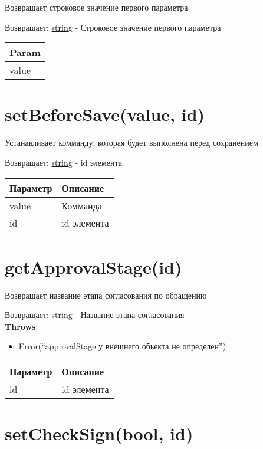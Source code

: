 Возвращает строковое значение первого параметра

Возвращает: \protect\hyperlink{string}{string} - Строковое
значение первого параметра

\begin{longtable}[]{@{}l@{}}
\toprule
Param\tabularnewline
\midrule
\endhead
value\tabularnewline
\bottomrule
\end{longtable}

\hypertarget{setbeforesavevalue-id-string}{%
\section{setBeforeSave(value, id)}\label{setbeforesavevalue-id-string}}

Устанавливает комманду, которая будет выполнена перед сохранением

Возвращает: \protect\hyperlink{string}{string} - id элемента

\begin{longtable}[]{@{}ll@{}}
\toprule
Параметр & Описание\tabularnewline
\midrule
\endhead
value & Комманда\tabularnewline
id & id элемента\tabularnewline
\bottomrule
\end{longtable}

\hypertarget{getapprovalstageid-string}{%
\section{getApprovalStage(id)}\label{getapprovalstageid-string}}

Возвращает название этапа согласования по обращению

Возвращает: \protect\hyperlink{string}{string} - Название этапа
согласования\\
\textbf{Throws}:

\begin{itemize}
\tightlist
\item
  Error(``approvalStage у внешнего обьекта не определен'')
\end{itemize}

\begin{longtable}[]{@{}ll@{}}
\toprule
Параметр & Описание\tabularnewline
\midrule
\endhead
id & id элемента\tabularnewline
\bottomrule
\end{longtable}

\hypertarget{setchecksignbool-id}{%
\section{setCheckSign(bool, id)}\label{setchecksignbool-id}}

